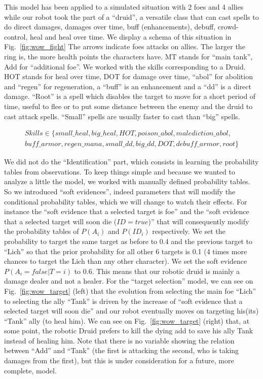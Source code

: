This model has been applied to a simulated situation with 2 foes and 4 allies while our robot took the part of a ``druid'', a versatile class that can cast spells to do direct damages, damages over time, buff (enhancements), debuff, crowd-control, heal and heal over time. We display a schema of this situation in Fig.~\ref{fig:wow_fight} The arrows indicate foes attacks on allies. The larger the ring is, the more health points the characters have. MT stands for ``main tank'', Add for ``additional foe''. We worked with the skills corresponding to a Druid. HOT stands for heal over time, DOT for damage over time, ``abol'' for abolition and ``regen'' for regeneration, a ``buff'' is an enhancement and a ``dd'' is a direct damage. ``Root'' is a spell which disables the target to move for a short period of time, useful to flee or to put some distance between the enemy and the druid to cast attack spells. ``Small'' spells are usually faster to cast than ``big'' spells.

\begin{eqnarray*}
Skills \in \{ small\_heal, big\_heal, HOT, poison\_abol, malediction\_abol,\\
            buff\_armor, regen\_mana, small\_dd, big\_dd, DOT, debuff\_armor, root \}
\end{eqnarray*}

We did not do the ``Identification'' part, which consists in learning the probability tables from observations. To keep things simple and because we wanted to analyze a little the model, we worked with manually defined probability tables. So we introduced ``soft evidences'', indeed parameters that will modify the conditional probability tables, which we will change to watch their effects. For instance the ``soft evidence that a selected target is foe'' and the ``soft evidence that a selected target will soon die ($ID=true$)'' that will consequently modify the probability tables of $P(A_i)$ and $P(ID_i)$ respectively. We set the probability to target the same target as before to 0.4 and the previous target to ``Lich'' so that the prior probability for all other 6 targets is 0.1 (4 times more chances to target the Lich than any other character). We set the soft evidence $P(A_i=false|T=i)$ to 0.6. This means that our robotic druid is mainly a damage dealer and not a healer. For the ``target selection'' model, we can see on Fig.~\ref{fig:wow_target} (left) that the evolution from selecting the main foe ``Lich'' to selecting the ally ``Tank'' is driven by the increase of ``soft evidence that a selected target will soon die'' and our robot eventually moves on targeting his(its) ``Tank'' ally (to heal him). We can see on Fig.~\ref{fig:wow_target} (right) that, at some point, the robotic Druid prefers to kill the dying add to save his ally Tank instead of healing him. Note that there is no variable showing the relation between ``Add'' and ``Tank'' (the first is attacking the second, who is taking damages from the first), but this is under consideration for a future, more complete, model.

